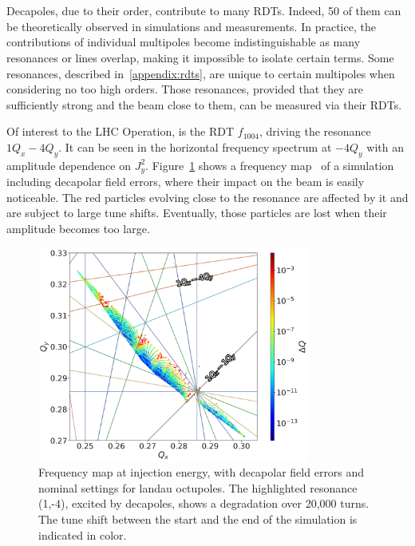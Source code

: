 \section{}

Decapoles, due to their order, contribute to many RDTs. Indeed, 50 of them can be theoretically 
observed in simulations and measurements. In practice, the contributions of individual multipoles
become indistinguishable as many resonances or lines overlap, making it impossible to isolate
certain terms. Some resonances, described in~\cref{appendix:rdts}, are unique to certain multipoles
when considering no too high orders. Those resonances, provided that they are sufficiently strong
and the beam close to them, can be measured via their RDTs.

Of interest to the LHC Operation, is the RDT $f_{1004}$, driving the resonance $1Q_x - 4Q_y$.
It can be seen in the horizontal frequency spectrum at $-4Q_y$ with an amplitude dependence on
$J_y^2$. 
Figure~\cref{fig:decapoles:rdts:tune_diagram} shows a frequency
map~\cite{yannis_papaphilippou_detecting_2014} of a simulation including decapolar field errors,
where their impact on the beam is easily noticeable. The red particles evolving close to the
resonance are affected by it and are subject to large tune shifts. Eventually, those particles are 
lost when their amplitude becomes too large.

\begin{figure}[!htb]
    \centering
    \includegraphics[width=0.8\textwidth]{./images/tune_diagram_f1004.pdf}
    \caption{Frequency map at injection energy, with decapolar field errors and nominal settings for
    landau octupoles. The highlighted resonance (1,-4), excited by decapoles, shows a degradation
    over 20,000 turns. The tune shift between the start and the end of the simulation is indicated
    in color.}
    \label{fig:decapoles:rdts:tune_diagram}
\end{figure}

